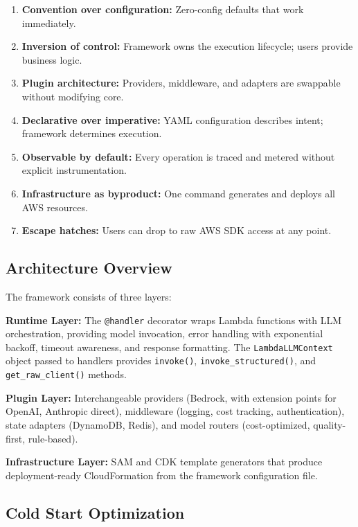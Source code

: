 \documentclass[10pt,twocolumn,letterpaper]{article}
\begin{document}
\begin{enumerate}[leftmargin=*,itemsep=2pt,topsep=2pt]
    \item \textbf{Convention over configuration:} Zero-config defaults that work immediately.
    \item \textbf{Inversion of control:} Framework owns the execution lifecycle; users provide business logic.
    \item \textbf{Plugin architecture:} Providers, middleware, and adapters are swappable without modifying core.
    \item \textbf{Declarative over imperative:} YAML configuration describes intent; framework determines execution.
    \item \textbf{Observable by default:} Every operation is traced and metered without explicit instrumentation.
    \item \textbf{Infrastructure as byproduct:} One command generates and deploys all AWS resources.
    \item \textbf{Escape hatches:} Users can drop to raw AWS SDK access at any point.
\end{enumerate}

\subsection{Architecture Overview}

The framework consists of three layers:

\textbf{Runtime Layer:} The \texttt{@handler} decorator wraps Lambda functions with LLM orchestration, providing model invocation, error handling with exponential backoff, timeout awareness, and response formatting. The \texttt{LambdaLLMContext} object passed to handlers provides \texttt{invoke()}, \texttt{invoke\_structured()}, and \texttt{get\_raw\_client()} methods.

\textbf{Plugin Layer:} Interchangeable providers (Bedrock, with extension points for OpenAI, Anthropic direct), middleware (logging, cost tracking, authentication), state adapters (DynamoDB, Redis), and model routers (cost-optimized, quality-first, rule-based).

\textbf{Infrastructure Layer:} SAM and CDK template generators that produce deployment-ready CloudFormation from the framework configuration file.

\subsection{Cold Start Optimization}
\end{document}
